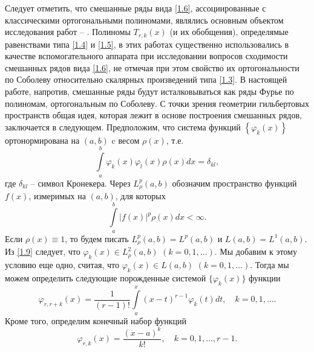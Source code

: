          Следует отметить, что смешанные ряды вида \eqref{1.6}, ассоциированные с классическими ортогональными полиномами, являлись основным объектом исследования работ  \cite{Shar11} -- \cite{Shar18}.
Полиномы $T_{r,k}(x)$ (и их обобщения), определямые равенствами типа \eqref{1.4} и \eqref{1.5}, в этих работах существенно использовались в качестве вспомогательного аппарата при исследовании вопросов сходимости смешанных рядов вида \eqref{1.6},  не отмечая при  этом свойство их ортогональности по Соболеву относительно скалярных произведений типа \eqref{1.3}. В настоящей работе, напротив, смешанные ряды будут исталковываться как ряды Фурье по полиномам, ортогональным по Соболеву. С точки зрения геометрии гильбертовых пространств общая идея, которая лежит в основе построения смешанных рядов, заключается в следующем. Предположим, что система функций  $\left\{\varphi_k(x)\right\}$ ортонормирована  на $(a,b)$  c весом   $\rho(x)$, т.е.
 \begin{equation}\label{1.9}
\int\limits_a^b\varphi_k(x)\varphi_l(x)\rho(x)dx=\delta_{kl},
\end{equation}
где $\delta_{kl}$ -- символ Кронекера. Через $L^p_\rho(a,b)$ обозначим пространство  функций $f(x)$, измеримых  на  $(a,b)$, для которых
 \begin{equation*}
\int\limits_a^b|f(x)|^p\rho(x)dx<\infty.
\end{equation*}
Если $\rho(x)\equiv1$, то будем писать $L^p_\rho(a,b)=L^p(a,b)$ и $L(a,b)=L^1(a,b)$.
Из \eqref{1.9} следует, что $\varphi_k(x)\in L^2_\rho(a,b)$ $(k=0,1,\ldots)$. Мы добавим к этому условию еще одно, считая, что $\varphi_k(x)\in L(a,b)$ $(k=0,1,\ldots)$. Тогда мы можем определить следующие порожденные системой $\{\varphi_k(x)\}$ функции
 \begin{equation}\label{1.10}
\varphi_{r,r+k}(x) =\frac{1}{(r-1)!}\int\limits_a^x(x-t)^{r-1}\varphi_{k}(t)dt, \quad k=0,1,\ldots.
\end{equation}
 Кроме того, определим конечный набор функций
  \begin{equation}\label{1.11}
\varphi_{r,k}(x) =\frac{(x-a)^k}{k!}, \quad k=0,1,\ldots, r-1.
\end{equation}

